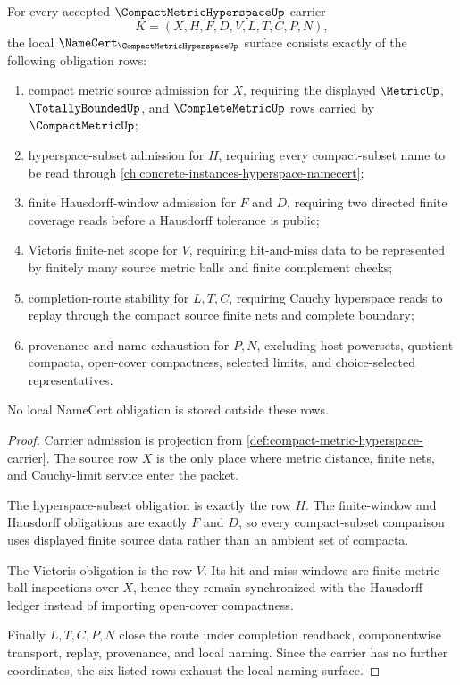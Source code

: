 \begin{theorem}
\label{thm:compact-metric-hyperspace-namecert-obligations}
For every accepted $\CompactMetricHyperspaceUp$ carrier
$$
K=(X,H,F,D,V,L,T,C,P,N),
$$
the local $\NameCert_{\CompactMetricHyperspaceUp}$ surface consists exactly of the following obligation rows:
\begin{enumerate}
\item compact metric source admission for $X$, requiring the displayed $\MetricUp$, $\TotallyBoundedUp$, and $\CompleteMetricUp$ rows carried by $\CompactMetricUp$;
\item hyperspace-subset admission for $H$, requiring every compact-subset name to be read through \autoref{ch:concrete-instances-hyperspace-namecert};
\item finite Hausdorff-window admission for $F$ and $D$, requiring two directed finite coverage reads before a Hausdorff tolerance is public;
\item Vietoris finite-net scope for $V$, requiring hit-and-miss data to be represented by finitely many source metric balls and finite complement checks;
\item completion-route stability for $L,T,C$, requiring Cauchy hyperspace reads to replay through the compact source finite nets and complete boundary;
\item provenance and name exhaustion for $P,N$, excluding host powersets, quotient compacta, open-cover compactness, selected limits, and choice-selected representatives.
\end{enumerate}
No local NameCert obligation is stored outside these rows.
\end{theorem}
\begin{proof}
Carrier admission is projection from \autoref{def:compact-metric-hyperspace-carrier}. The source row $X$ is the only place where metric distance, finite nets, and Cauchy-limit service enter the packet.

The hyperspace-subset obligation is exactly the row $H$. The finite-window and Hausdorff obligations are exactly $F$ and $D$, so every compact-subset comparison uses displayed finite source data rather than an ambient set of compacta.

The Vietoris obligation is the row $V$. Its hit-and-miss windows are finite metric-ball inspections over $X$, hence they remain synchronized with the Hausdorff ledger instead of importing open-cover compactness.

Finally $L,T,C,P,N$ close the route under completion readback, componentwise transport, replay, provenance, and local naming. Since the carrier has no further coordinates, the six listed rows exhaust the local naming surface.
\end{proof}

